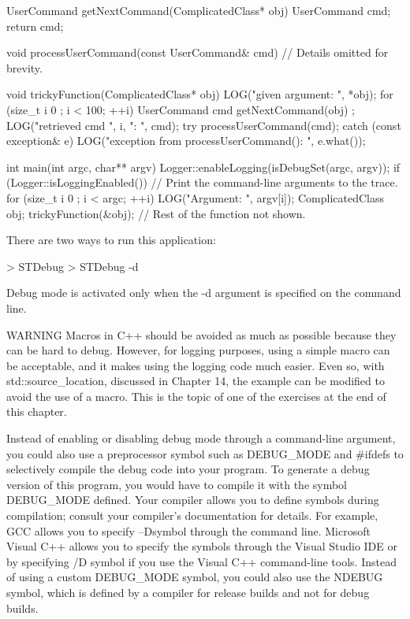 \begin{cpp}
UserCommand getNextCommand(ComplicatedClass* obj)
{
    UserCommand cmd;
    return cmd;
}

void processUserCommand(const UserCommand& cmd)
{
    // Details omitted for brevity.
}

void trickyFunction(ComplicatedClass* obj)
{
    LOG("given argument: ", *obj);
    for (size_t i { 0 }; i < 100; ++i) {
        UserCommand cmd { getNextCommand(obj) };
        LOG("retrieved cmd ", i, ": ", cmd);
        try {
            processUserCommand(cmd);
        } catch (const exception& e) {
            LOG("exception from processUserCommand(): ", e.what());
        }
    }
}

int main(int argc, char** argv)
{
    Logger::enableLogging(isDebugSet(argc, argv));
    if (Logger::isLoggingEnabled()) {
        // Print the command-line arguments to the trace.
        for (size_t i { 0 }; i < argc; ++i) {
            LOG("Argument: ", argv[i]);
        }
    }
    ComplicatedClass obj;
    trickyFunction(&obj);
    // Rest of the function not shown.
}
\end{cpp}

There are two ways to run this application:

\begin{shell}
> STDebug
> STDebug -d
\end{shell}

Debug mode is activated only when the -d argument is specified on the command line.

\begin{myWarning}{WARNING}
Macros in C++ should be avoided as much as possible because they can be hard to debug. However, for logging purposes, using a simple macro can be acceptable, and it makes using the logging code much easier. Even so, with std::source\_location, discussed in Chapter 14, the example can be modified to avoid the use of a macro. This is the topic of one of the exercises at the end of this chapter.
\end{myWarning}


Instead of enabling or disabling debug mode through a command-line argument, you could also use a preprocessor symbol such as DEBUG\_MODE and \#ifdefs to selectively compile the debug code into your program. To generate a debug version of this program, you would have to compile it with the symbol DEBUG\_MODE defined. Your compiler allows you to define symbols during compilation; consult your compiler’s documentation for details. For example, GCC allows you to specify –Dsymbol through the command line. Microsoft Visual C++ allows you to specify the symbols through the Visual Studio IDE or by specifying /D symbol if you use the Visual C++ command-line tools. Instead of using a custom DEBUG\_MODE symbol, you could also use the NDEBUG symbol, which is defined by a compiler for release builds and not for debug builds.

